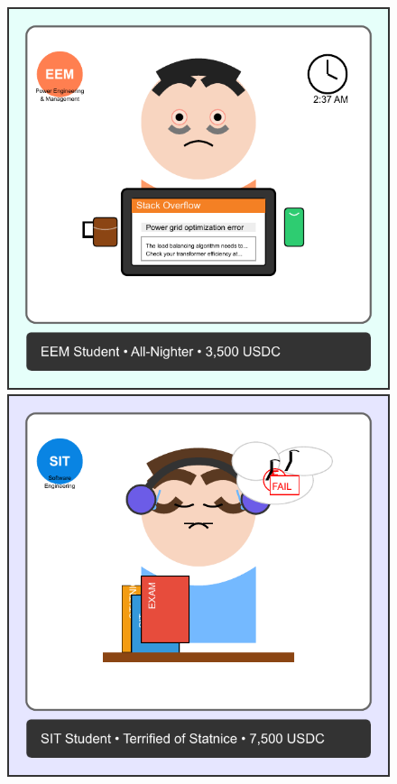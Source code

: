 \documentclass[12pt]{article}
\begin{document}
\begin{figure}[h!]
  \centering
  \begin{minipage}{0.3\textwidth}
    \includegraphics[width=\textwidth]{NFTs/nft-eem-stackoverflow.pdf}
  \end{minipage}
  \hfill
  \begin{minipage}{0.3\textwidth}
    \includegraphics[width=\textwidth]{NFTs/nft-sit-dreaming.pdf}

\end{minipage}
\end{figure}
\end{document}
